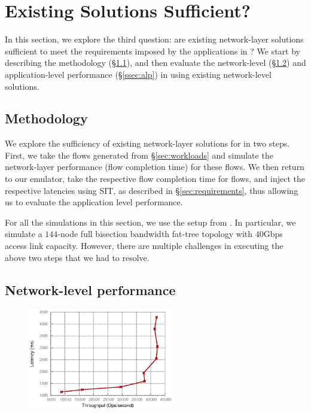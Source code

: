 \section{Existing Solutions Sufficient?}
\label{sec:existing}
In this section, we explore the third question: are existing network-layer solutions sufficient to meet the requirements imposed by the applications in \dis? We start by describing the methodology (\S\ref{ssec:ssmethod}), and then evaluate the network-level (\S\ref{ssec:nlp}) and application-level performance (\S\ref{ssec:alp}) in \dis using existing network-level solutions.

\subsection{Methodology}
\label{ssec:ssmethod}
We explore the sufficiency of existing network-layer solutions for \dis in two steps. First, we take the flows generated from \S\ref{sec:workloads} and simulate the network-layer performance (flow completion time) for these flows. We then return to our emulator, take the respective flow completion time for flows, and inject the respective latencies using SIT, as described in \S\ref{sec:requirements}, thus allowing us to evaluate the application level performance. 

For all the simulations in this section, we use the setup from \cite{phost}. In particular, we simulate a $144$-node full bisection bandwidth fat-tree topology with $40$Gbps access link capacity.  However, there are multiple challenges in executing the above two steps that we had to resolve.




\subsection{Network-level performance}
\label{ssec:nlp}

%
\begin{figure}
  \centering
    \includegraphics[width = 2.5in]{img/thvsla_get} 
  \caption{\small{}}
  \label{fig:phostp}
\end{figure}
%

